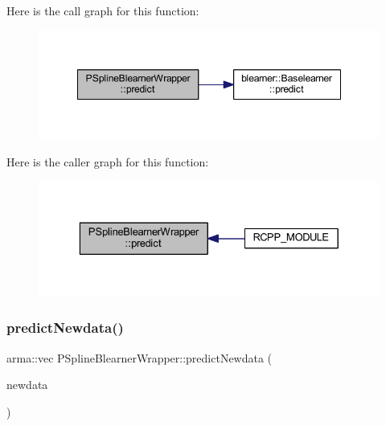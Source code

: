 Here is the call graph for this function\+:\nopagebreak
\begin{figure}[H]
\begin{center}
\leavevmode
\includegraphics[width=348pt]{class_p_spline_blearner_wrapper_a43a442f80348b28fc40d8e4773678511_cgraph}
\end{center}
\end{figure}
Here is the caller graph for this function\+:\nopagebreak
\begin{figure}[H]
\begin{center}
\leavevmode
\includegraphics[width=329pt]{class_p_spline_blearner_wrapper_a43a442f80348b28fc40d8e4773678511_icgraph}
\end{center}
\end{figure}
\mbox{\label{class_p_spline_blearner_wrapper_af90fe0fce13519086f8e54fe4d2cc539}} 
\subsubsection{\texorpdfstring{predict\+Newdata()}{predictNewdata()}}
{\footnotesize\ttfamily arma\+::vec P\+Spline\+Blearner\+Wrapper\+::predict\+Newdata (\begin{DoxyParamCaption}\item[{\mbox{\hyperlink{class_data_wrapper}{Data\+Wrapper}} \&}]{newdata }\end{DoxyParamCaption})\hspace{0.3cm}{\ttfamily [inline]}}

